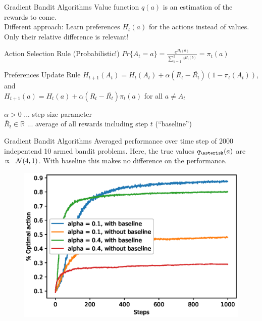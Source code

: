 \documentclass{beamer}
\begin{document}
\begin{frame}{Gradient Bandit Algorithms}
	Value function $q(a)$ is an estimation of the rewards to come. \\
	Different approach: Learn preferences $H_t (a)$ for the actions instead of values. Only their relative difference is relevant! \\
	\begin{alertblock}{Action Selection Rule (Probabilistic!)}
		$Pr\{ A_t = a \} = \frac{ e^{H_t (a)} }{  \sum_{b=1}^{k} e^{H_t (b)} } = \pi_t (a)$
	\end{alertblock}

	\begin{alertblock}{Preferences Update Rule}
		$ H_{t+1} (A_t) = H_t(A_t) + \alpha (R_t - \overline{R_t})(1 - \pi_t (A_t)) $, and \\
		$ H_{t+1} (a) = H_t(a) + \alpha (R_t - \overline{R_t})\pi_t (a) $ for all $a \ne A_t$
	\end{alertblock}	
	
	$\alpha > 0$ ... step size parameter\\
	$\overline{R}_t \in \mathbb{R}$ ... average of all rewards including step $t$ (``baseline'') 
	
\end{frame}

\begin{frame}{Gradient Bandit Algorithms}
Averaged performance over time step of 2000 indepentend 10 armed bandit problems. Here, the true values $q_{\asterisk}(a)$ are $ \propto \hspace{0.2cm} \mathcal{N}(4,1)$. With baseline this makes no difference on the performance.
	\begin{figure}
	\centering
	\includegraphics[width=0.75\linewidth]{Images/figure_2_5.eps}\\	
	\end{figure}
\end{frame}
\end{document}
